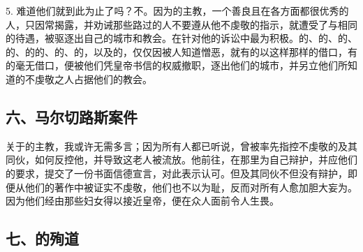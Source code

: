 5. 难道他们就到此为止了吗？不。因为的主教，一个善良且在各方面都很优秀的人，只因常揭露，并劝诫那些路过的人不要遵从他不虔敬的指示，就遭受了与相同的待遇，被驱逐出自己的城市和教会。在针对他的诉讼中最为积极。的、的、的、的、的的、的、的，以及的，仅仅因被人知道憎恶，就有的以这样那样的借口，有的毫无借口，便被他们凭皇帝书信的权威撤职，逐出他们的城市，并另立他们所知道的不虔敬之人占据他们的教会。\par


\subsection{六、马尔切路斯案件}

关于的主教，我或许无需多言；因为所有人都已听说，曾被率先指控不虔敬的及其同伙，如何反控他，并导致这老人被流放。他前往，在那里为自己辩护，并应他们的要求，提交了一份书面信德宣言，对此表示认可。但及其同伙不但没有辩护，即便从他们的著作中被证实不虔敬，他们也不以为耻，反而对所有人愈加胆大妄为。因为他们经由那些妇女得以接近皇帝，便在众人面前令人生畏。\par


\subsection{七、的殉道}

